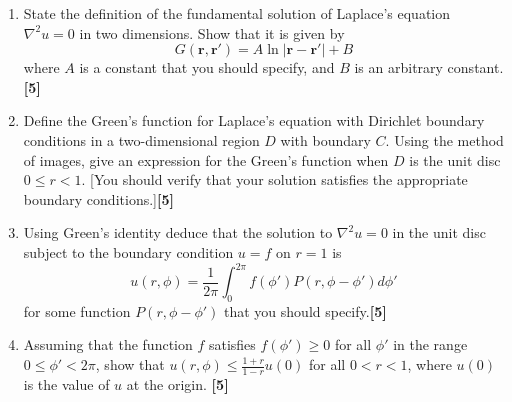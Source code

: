 \documentclass[a4paper]{article}
\begin{document}
\begin{qns}\leavevmode
\begin{enumerate}[label=(\alph*)]
\item State the definition of the fundamental solution of Laplace’s equation $\nabla^2u=0$ in two dimensions. Show that it is given by
$$G(\mathbf{r}, \mathbf{r'}) = A\ln |\mathbf{r} −\mathbf{r'}| + B$$
where $A$ is a constant that you should specify, and $B$ is an arbitrary constant.\hfill\textbf{[5]}
\item Define the Green’s function for Laplace’s equation with Dirichlet boundary conditions in a two-dimensional region $D$ with boundary $C$. Using the method of images, give an expression for the Green’s function when $D$ is the unit disc $0\leq r<1$. [You should verify that your solution satisfies the appropriate boundary conditions.]\hfill\textbf{[5]}
\item Using Green’s identity deduce that the solution to $\nabla^2u=0$ in the unit disc subject to the boundary condition $u = f$ on $r = 1$ is
$$u(r,\phi)=\frac{1}{2\pi}\int_0^{2\pi}f(\phi')P(r,\phi-\phi')d\phi'$$
for some function $P(r,\phi-\phi')$ that you should specify.\hfill\textbf{[5]}
\item Assuming that the function $f$ satisfies $f(\phi')\geq0$ for all $\phi'$ in the range $0\leq\phi'<2\pi$, show that $u(r,\phi)\leq\frac{1+r}{1-r}u(0)$ for all $0 < r < 1$, where $u(0)$ is the value of $u$ at the origin. \hfill\textbf{[5]}
\end{enumerate}
\end{qns}
\end{document}
